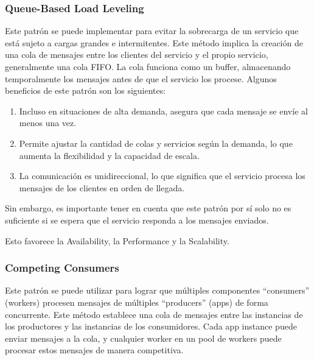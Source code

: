 \documentclass{article}
\begin{document}
		\subsubsection{Queue-Based Load Leveling}
		Este patrón se puede implementar para evitar la sobrecarga de un servicio que está sujeto a cargas grandes e intermitentes. Este método implica la creación de una cola de mensajes entre los clientes del servicio y el propio servicio, generalmente una cola FIFO. La cola funciona como un buffer, almacenando temporalmente los mensajes antes de que el servicio los procese.
		Algunos beneficios de este patrón son los siguientes:
			\begin{enumerate}
				\item Incluso en situaciones de alta demanda, asegura que cada mensaje se envíe al menos una vez. 
				\item Permite ajustar la cantidad de colas y servicios según la demanda, lo que aumenta la flexibilidad y la capacidad de escala.
				\item La comunicación es unidireccional, lo que significa que el servicio procesa los mensajes de los clientes en orden de llegada.
			\end{enumerate}

		Sin embargo, es importante tener en cuenta que este patrón por sí solo no es suficiente si se espera que el servicio responda a los mensajes enviados.
		
		Esto favorece la Availability, la Performance y la Scalability.
		
		\subsubsection{Competing Consumers}
		Este patrón se puede utilizar para lograr que múltiples componentes ``consumers'' (workers) procesen mensajes de múltiples ``producers'' (apps) de forma concurrente. Este método establece una cola de mensajes entre las instancias de los productores y las instancias de los consumidores. Cada app instance puede enviar mensajes a la cola, y cualquier worker en un pool de workers puede procesar estos mensajes de manera competitiva.
		
\end{document}

